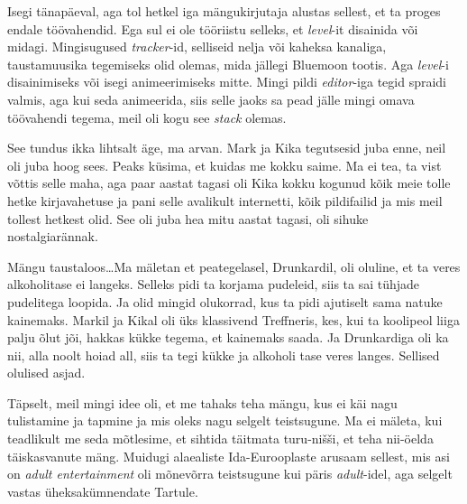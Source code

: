 
Isegi tänapäeval, aga tol hetkel iga mängukirjutaja alustas sellest, et ta 
proges endale töövahendid. Ega sul ei ole tööriistu selleks, et \emph{level}-it 
disainida või midagi. Mingisugused \emph{tracker}-id, selliseid nelja või 
kaheksa kanaliga, taustamuusika tegemiseks olid olemas, mida jällegi 
Bluemoon tootis. Aga \emph{level}-i disainimiseks või isegi 
animeerimiseks mitte. Mingi pildi \emph{editor}-iga tegid spraidi valmis, aga kui seda animeerida, siis selle jaoks sa pead 
jälle mingi omava töövahendi tegema, meil oli kogu see \emph{stack} olemas.


See tundus ikka lihtsalt äge, ma arvan. Mark ja 
Kika tegutsesid juba enne, neil oli juba hoog 
sees. Peaks küsima, et kuidas me kokku saime. Ma ei tea, ta vist võttis selle 
maha, aga paar aastat tagasi oli Kika kokku kogunud kõik meie tolle hetke 
kirjavahetuse ja pani selle avalikult internetti, kõik  pildifailid ja mis meil 
tollest hetkest olid. See oli juba hea mitu aastat tagasi, oli  sihuke 
nostalgiarännak. 

Mängu taustaloos\ldots Ma mäletan et peategelasel, Drunkardil, oli oluline, et 
ta veres alkoholitase ei langeks. Selleks pidi ta korjama pudeleid, siis ta sai 
tühjade pudelitega loopida. Ja olid mingid olukorrad, kus ta pidi ajutiselt 
sama natuke kainemaks. Markil ja 
Kikal oli üks klassivend Treffneris, kes, kui ta 
koolipeol liiga palju õlut jõi,  hakkas kükke tegema, et kainemaks saada. Ja 
Drunkardiga oli ka nii, alla noolt hoiad all, siis ta tegi kükke ja alkoholi 
tase veres langes. Sellised olulised asjad.


Täpselt, meil mingi idee oli, et me tahaks teha mängu, kus ei käi nagu 
tulistamine ja tapmine ja mis oleks nagu selgelt teistsugune. Ma ei mäleta, kui 
teadlikult me seda mõtlesime, et sihtida täitmata turu-nišši, et teha nii-öelda 
täiskasvanute mäng. Muidugi alaealiste Ida-Eurooplaste arusaam sellest, mis asi 
on \emph{adult entertainment} oli mõnevõrra teistsugune kui päris 
\emph{adult}-idel, aga selgelt vastas üheksakümnendate Tartule.

